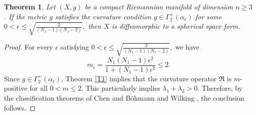 \documentclass[12pt, twoside]{article}
\newtheorem{theorem}{Theorem}[section]
\theoremstyle{definition}
\numberwithin{equation}{section}
\def \a {\alpha }
\begin{document}
\begin{theorem}\label{T3}
Let $(X,g)$ be a compact Riemannian manifold of dimension $n\geq3$. If the metric $g$ satisfies the curvature condition $g\in\Gamma^{+}_{2}(\a_{\epsilon})$ for some  $0<\epsilon\leq\sqrt{\frac{2}{(N_{1}-1)(N_{1}-2)}},$ 
then $X$ is diffeomorphic to a spherical space form.
\end{theorem}
\begin{proof}
For every $\epsilon$ satisfying $0<\epsilon\leq\sqrt{\frac{2}{(N_{1}-1)(N_{1}-2)}},$  we have
\[
m_{\epsilon}=\frac{N_{1}(N_1-1)\epsilon^2}{1+(N_1-1)\epsilon^2}\leq 2.
\]
Since $g\in\Gamma^{+}_{2}(\a_{\epsilon})$, Theorem \ref{T1} implies that the curvature operator $\mathfrak{R}$  is $m$-positive for all $0<m\leq2$. This particularly implies $\lambda_{1}+\lambda_{2}>0$. Therefore, by the classification theorems of Chen \cite{Che91} and B\"{o}hmann and Wilking \cite{BW08}, the conclusion follows.
\end{proof}
\end{document}
